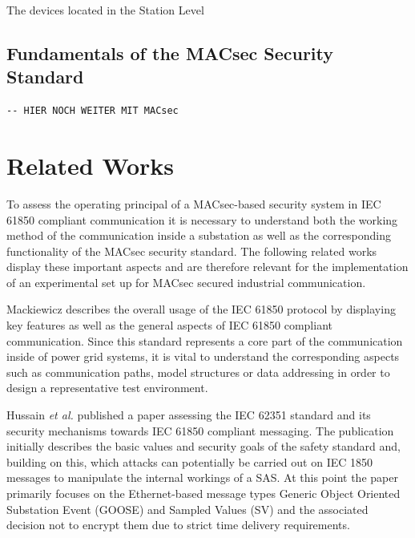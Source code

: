\documentclass[conference]{IEEEtran}
\begin{document}
The devices located in the Station Level


\subsection{Fundamentals of the MACsec Security Standard}

\begin{verbatim}
-- HIER NOCH WEITER MIT MACsec
\end{verbatim}


\section{Related Works}
\label{chapter:relatedWork}
\noindent To assess the operating principal of a MACsec-based security system in IEC 61850 compliant communication it is necessary to understand both 
the working method of the communication inside a substation as well as the corresponding functionality of the MACsec security standard. The following 
related works display these important aspects and are therefore relevant for the implementation of an experimental set up for MACsec secured industrial 
communication.

\smallskip
Mackiewicz \cite{IEC61850_Overview:2006} describes the overall usage of the IEC 61850 protocol by displaying key features as well as the general aspects 
of IEC 61850 compliant communication. Since this standard represents a core part of the communication inside of power grid systems, it is vital to 
understand the corresponding aspects such as communication paths, model structures or data addressing in order to design a representative test environment. 

\smallskip
Hussain  \textit{et al.} \cite{Review_IEC62351:2019} published a paper assessing the IEC 62351 standard and its security mechanisms towards IEC 61850 
compliant messaging. The publication initially describes the basic values and security goals of the safety standard and, building on this, which attacks 
can potentially be carried out on IEC 1850 messages to manipulate the internal workings of a SAS. At this point the paper primarily focuses on the 
Ethernet-based message types Generic Object Oriented Substation Event (GOOSE) and Sampled Values (SV) and the associated decision not to encrypt them due 
to strict time delivery requirements.  
\end{document}
